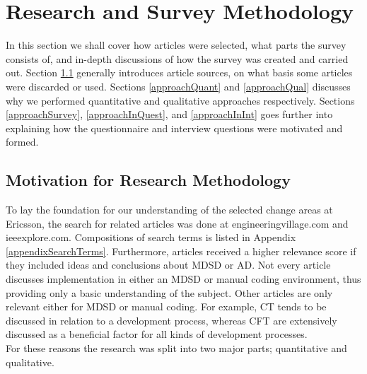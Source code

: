 \documentclass[final_report_innit.tex]{subfiles}
\begin{document}
\section{Research and Survey Methodology}\label{approach}
In this section we shall cover how articles were selected, what parts the survey consists of, and in-depth discussions of how the survey was created and carried out. Section \ref{approachChoice} generally introduces article sources, on what basis some articles were discarded or used. Sections \ref{approachQuant} and \ref{approachQual} discusses why we performed quantitative and qualitative approaches respectively. Sections \ref{approachSurvey}, \ref{approachInQuest}, and \ref{approachInInt} goes further into explaining how the questionnaire and interview questions were motivated and formed.

\subsection{Motivation for Research Methodology}\label{approachChoice}
To lay the foundation for our understanding of the selected change areas at Ericsson, the search for related articles was done at engineeringvillage.com and ieeexplore.com. Compositions of search terms is listed in Appendix \ref{appendixSearchTerms}. Furthermore, articles received a higher relevance score if they included ideas and conclusions about MDSD or AD. Not every article discusses implementation in either an MDSD or manual coding environment, thus providing only a basic understanding of the subject. Other articles are only relevant either for MDSD or manual coding. For example, CT tends to be discussed in relation to a development process, whereas CFT are extensively discussed as a beneficial factor for all kinds of development processes.
\\

For these reasons the research was split into two major parts; quantitative and qualitative.
\\
\end{document}
